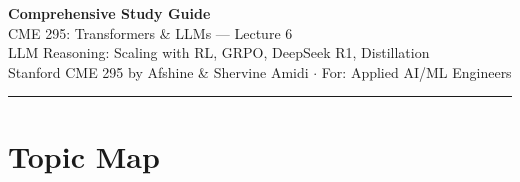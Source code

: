 \documentclass[11pt, a4paper]{article}
\begin{document}
\begin{center}
{\LARGE\bfseries\color{defblue} Comprehensive Study Guide}\\[6pt]
{\Large CME 295: Transformers \& LLMs --- Lecture 6}\\[4pt]
{\normalsize LLM Reasoning: Scaling with RL, GRPO, DeepSeek R1, Distillation}\\[4pt]
{\small Stanford CME 295 by Afshine \& Shervine Amidi $\cdot$ For: Applied AI/ML Engineers}\\[2pt]
\rule{\textwidth}{0.4pt}
\end{center}

\tableofcontents
\newpage

\section{Topic Map}
\end{document}
